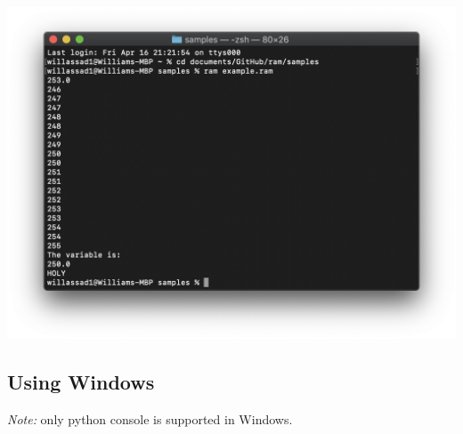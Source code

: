 \documentclass[fontsize=11pt]{article}
\begin{document}
\begin{itemize}
\begin{itemize}
            \begin{center}
                \includegraphics[scale=0.42]{terminal6.png}
            \end{center}
            
        \end{itemize}
    \end{itemize} 

\subsection*{Using Windows}

\emph{Note:} only python console is supported in Windows.
\end{document}
